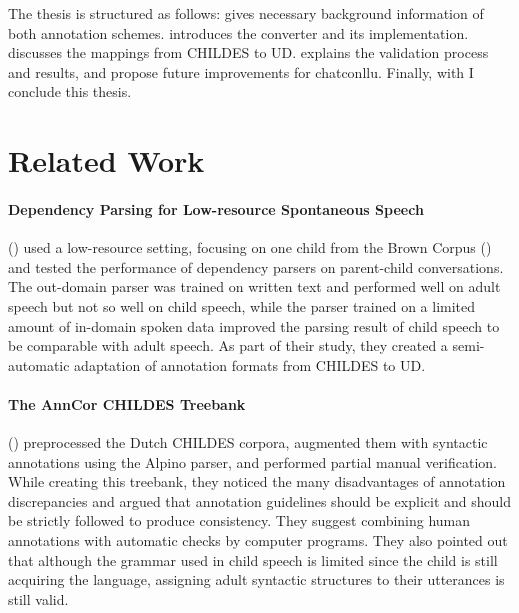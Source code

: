 The thesis is structured as follows:  gives necessary background information of both annotation schemes.  introduces the converter and its implementation.  discusses the mappings from CHILDES to UD.  explains the validation process and results, and propose future improvements for chatconllu. Finally, with  I conclude this thesis.

\section{Related Work}

\paragraph{Dependency Parsing for Low-resource Spontaneous Speech} %
\label{par:zoey}
(\cite{liu2021}) used a low-resource setting, focusing on one child from the Brown Corpus (\cite{brown1973}) and tested the performance of dependency parsers on parent-child conversations. The out-domain parser was trained on written text and performed well on adult speech but not so well on child speech, while the parser trained on a limited amount of in-domain spoken data improved the parsing result of child speech to be comparable with adult speech. As part of their study, they created a semi-automatic adaptation of annotation formats from CHILDES to UD.

\paragraph{The AnnCor CHILDES Treebank}
(\cite{odijk2018anncor}) preprocessed the Dutch CHILDES corpora, augmented them with syntactic annotations using the Alpino parser, and performed partial manual verification. While creating this treebank, they noticed the many disadvantages of annotation discrepancies and argued that annotation guidelines should be explicit and should be strictly followed to produce consistency. They suggest combining human annotations with automatic checks by computer programs. They also pointed out that although the grammar used in child speech is limited since the child is still acquiring the language, assigning adult syntactic structures to their utterances is still valid.
